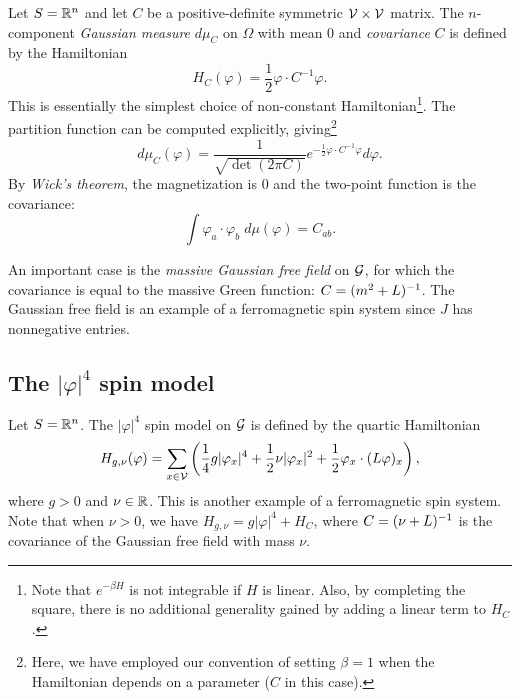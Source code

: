 Let $S = {\mathbb R}^n$ and let $C$ be a positive-definite symmetric $\mathcal{V}\times\mathcal{V}$ matrix. The $n$-component \emph{Gaussian measure} $d\mu_C$ on
$\Omega$ with mean $0$ and \emph{covariance} $C$ is defined by the Hamiltonian
\begin{equation}
H_C(\varphi) = \frac{1}{2} \varphi \cdot C^{-1} \varphi.
\end{equation}
This is essentially the simplest choice of non-constant
Hamiltonian\footnote{Note that $e^{-\beta H}$ is not integrable if $H$ is linear. Also, by completing the square, there is no additional generality gained by adding a linear term to $H_C$.}.
The partition function can be computed explicitly, giving\footnote{Here, we have employed our convention of setting $\beta = 1$ when the Hamiltonian depends on a parameter ($C$ in this case).}
\begin{equation}
d\mu_C(\varphi)
  =
\frac{1}{\sqrt{\det(2\pi C)}} e^{-\frac{1}{2} \varphi\cdot C^{-1}\varphi} d\varphi.
\end{equation}
By \emph{Wick's theorem}, the magnetization is $0$ and the two-point function is the covariance:
\begin{equation}
\int \varphi_a \cdot \varphi_b \; d\mu(\varphi) = C_{ab}.
\end{equation}

An important case is the \emph{massive Gaussian free field} on $\mathcal{G}$, for which the covariance is equal to the massive Green function:
$C = (m^2 + L)^{-1}$. The Gaussian free field is an example of a ferromagnetic spin system since $J$ has nonnegative entries.


\subsection{The \texorpdfstring{$|\varphi|^4$}{phi4} spin model}

Let $S = {\mathbb R}^n$. The $|\varphi|^4$ spin model on $\mathcal{G}$ is defined by the quartic Hamiltonian
\begin{equation}
H_{g,\nu}(\varphi)
  =
\sum_{x\in\mathcal{V}}
\left(
  \frac{1}{4} g |\varphi_x|^4
    +
  \frac{1}{2} \nu |\varphi_x|^2
    +
  \frac{1}{2} \varphi_x \cdot (L \varphi)_x
\right),
\end{equation}
where $g > 0$ and $\nu\in{\mathbb R}$. This is another example of a ferromagnetic spin system. Note that when $\nu > 0$, we have
$H_{g,\nu} = g |\varphi|^4 + H_C$, where $C = (\nu + L)^{-1}$ is the covariance of the Gaussian free field with mass $\nu$.

